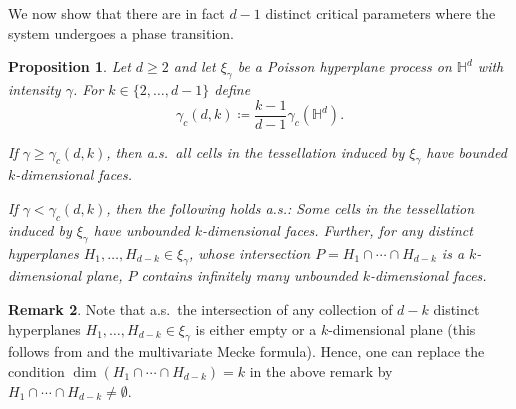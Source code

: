 \documentclass[12pt,a4paper]{article}
\newtheorem{proposition}{Proposition}[section]
\theoremstyle{definition}
\newtheorem{remark}[proposition]{Remark}
\renewcommand{\H}{\mathbb{H}}
\DeclareMathOperator{\supp}{supp}
\begin{document}
We now show that there are in fact $d-1$ distinct critical parameters where the system undergoes a phase transition.

\begin{proposition}\label{prop:multiple_phase}
    Let $d \geq 2$ and let $\xi_\gamma$ be a Poisson hyperplane process on $\H^d$ with intensity $\gamma$.
    For $k \in \{2,\ldots,d-1\}$ define
    \[ \gamma_c(d,k) \coloneqq \frac{k-1}{d-1} \gamma_c(\H^d). \]

    If $\gamma \geq \gamma_c(d,k)$, then a.s.\ all cells in the tessellation induced by $\xi_\gamma$ have bounded $k$-dimensional faces.

    If $\gamma < \gamma_c(d,k)$, then the following holds a.s.:
    Some cells in the tessellation induced by $\xi_\gamma$ have unbounded $k$-dimensional faces.
    Further, for any distinct hyperplanes $H_1,\ldots,H_{d-k} \in \xi_\gamma$, whose intersection $P = H_1 \cap \cdots\cap H_{d-k}$ is a $k$-dimensional plane, $P$ contains infinitely many unbounded $k$-dimensional faces.
\end{proposition}

\begin{remark}
    Note that a.s.~the intersection of any collection of $d-k$ distinct hyperplanes $H_1,\ldots,H_{d-k} \in \xi_\gamma$ is either empty or a $k$-dimensional plane (this follows from \cite[Lemma~2.3]{BHT23} and the multivariate Mecke formula).
    Hence, one can replace the condition $\dim(H_1\cap\cdots\cap H_{d-k})=k$ in the above remark by $H_1\cap\cdots\cap H_{d-k} \neq\emptyset$.
\end{remark}

\end{document}
